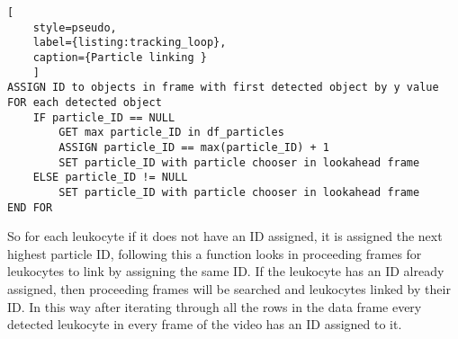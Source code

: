 \begin{lstlisting}[
	style=pseudo,
	label={listing:tracking_loop},
	caption={Particle linking }
	]
ASSIGN ID to objects in frame with first detected object by y value
FOR each detected object
	IF particle_ID == NULL
		GET max particle_ID in df_particles
		ASSIGN particle_ID == max(particle_ID) + 1
		SET particle_ID with particle chooser in lookahead frame
	ELSE particle_ID != NULL
		SET particle_ID with particle chooser in lookahead frame
END FOR
\end{lstlisting}

So for each leukocyte if it does not have an ID assigned, it is assigned the next highest particle ID, following this a function looks in proceeding frames for leukocytes to link by assigning the same ID. If the leukocyte has an ID already assigned, then proceeding frames will be searched and leukocytes linked by their ID. In this way after iterating through all the rows in the data frame every detected leukocyte in every frame of the video has an ID assigned to it.

